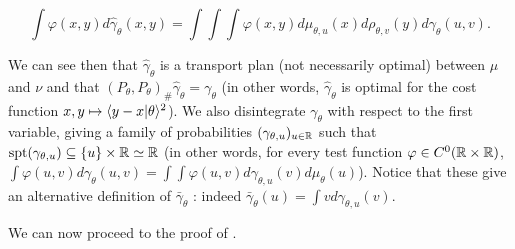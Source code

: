 \[ \int \varphi(x,y) d\hat{\gamma}_\theta(x,y) = \int \int \int \varphi(x,y) d\mu_{\theta,u}(x)d\rho_{\theta,v}(y) d\gamma_\theta(u,v). \]

We can see then that $\hat{\gamma}_\theta$ is a transport plan (not necessarily optimal) between $\mu$ and $\nu$ and that $(P_\theta,P_\theta)_\#\hat{\gamma}_\theta = \gamma_\theta$ (in other words, $\hat{\gamma}_\theta$ is optimal for the cost function $x,y \mapsto \langle y-x|\theta\rangle^2$). We also disintegrate $\gamma_\theta$ with respect to the first variable, giving a family of probabilities $(\gamma_{\theta,u})_{u \in \mathbb R}$ such that $\mathrm{spt} (\gamma_{\theta,u}) \subseteq \{u\} \times \mathbb R \simeq \mathbb R$ (in other words, for every test function $\varphi \in C^0(\mathbb R \times \mathbb R)$, $\int \varphi(u,v) d\gamma_\theta(u,v) = \int \int \varphi(u,v) d\gamma_{\theta,u}(v) d\mu_\theta(u)$). Notice that these give an alternative definition of $\bar{\gamma}_\theta$ : indeed $\bar{\gamma}_\theta(u) = \int v d\gamma_{\theta,u}(v)$.

We can now proceed to the proof of .

